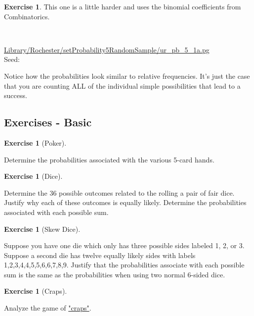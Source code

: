 \documentclass[10pt,]{book}
\theoremstyle{plain}
\theoremstyle{definition}
\theoremstyle{definition}
\theoremstyle{definition}
\newtheorem{exercise}[theorem]{Exercise}
\numberwithin{equation}{section}
\begin{document}
\begin{exercise}\label{exercise-17}
This one is a little harder and uses the binomial coefficients from Combinatorics.
\par\medskip
\mbox{}\\ %
\begin{mdframed}
{}\par\vspace*{2ex}%
{\tiny\ttfamily\noindent\url{Library/Rochester/setProbability5RandomSample/ur_pb_5_1a.pg}\\Seed: \hfill}\end{mdframed}
\medskip\noindent 
		Notice how the probabilities look similar to relative frequencies. It's just the case 
		that you are counting ALL of the individual simple possibilities that lead to a success.
\par
\end{exercise}
\typeout{************************************************}
\typeout{************************************************}
\subsection[{Exercises - Basic}]{Exercises - Basic}\label{subsection-2}
\begin{exercise}[{Poker}]\label{exercise-18}

	Determine the probabilities associated with the various 5-card hands.
\end{exercise}
\begin{exercise}[{Dice}]\label{exercise-19}

	Determine the 36 possible outcomes related to the rolling a pair of fair dice. Justify why each of these outcomes is equally likely. Determine the probabilities associated with each possible sum.
\end{exercise}
\begin{exercise}[{Skew Dice}]\label{exercise-20}

	Suppose you have one die which only has three possible sides labeled 1, 2, or 3. Suppose a second die has twelve equally likely sides with labels 1,2,3,4,4,5,5,6,6,7,8,9.  Justify that the probabilities associate with each possible sum is the same as the probabilities when using two normal 6-sided dice.
\end{exercise}
\begin{exercise}[{Craps}]\label{exercise-21}

	Analyze the game of
	\href{http://mathworld.wolfram.com/Craps.html}{"craps"}.
\end{exercise}
\typeout{************************************************}
\typeout{************************************************}
\end{document}
